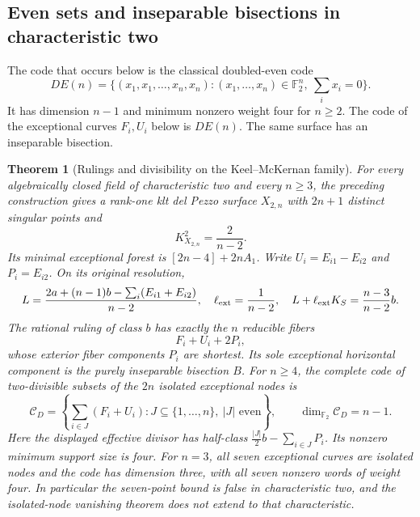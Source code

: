 \documentclass[11pt,reqno]{amsart}
\newtheorem{theorem}{Theorem}[section]
\theoremstyle{definition}
\theoremstyle{remark}
\newcommand{\FF}{\mathbb F}
\numberwithin{equation}{section}
\begin{document}
\subsection{Even sets and inseparable bisections in characteristic two}
The code that occurs below is the classical doubled-even code
\cite[Section~2]{DolgachevMendesLopesPardini}
\[
 DE(n)=\{(x_1,x_1,\ldots,x_n,x_n):
             (x_1,\ldots,x_n)\in\FF_2^n,\ \sum_i x_i=0\}.
\]
It has dimension $n-1$ and minimum nonzero weight four for $n\ge2$.
The code of the exceptional curves $F_i,U_i$ below is $DE(n)$.
The same surface has an inseparable bisection.

\begin{theorem}[Rulings and divisibility on the Keel--McKernan family]
\label{thm:characteristic-two}
For every algebraically closed field of characteristic two and every
$n\ge3$, the preceding construction gives a rank-one klt del Pezzo
surface $X_{2,n}$ with $2n+1$ distinct singular points and
\[
 K_{X_{2,n}}^2=\frac2{n-2}.
\]
Its minimal exceptional forest is $[2n-4]+2nA_1$.
Write $U_i=E_{i1}-E_{i2}$ and $P_i=E_{i2}$. On its original resolution,
\[
 L=\frac{2a+(n-1)b-\sum_i(E_{i1}+E_{i2})}{n-2},\quad
 \ell_{\rm ext}=\frac1{n-2},\quad
 L+\ell_{\rm ext}K_S=\frac{n-3}{n-2}b.
\]
The rational ruling of class $b$ has exactly the $n$ reducible
fibers
\[
 F_i+U_i+2P_i,
\]
whose exterior fiber components $P_i$ are shortest. Its sole exceptional
horizontal component is the purely inseparable bisection $B$.
For $n\ge4$, the complete code of two-divisible subsets of the $2n$
isolated exceptional nodes is
\[
 \mathcal C_D=
 \left\{\sum_{i\in J}(F_i+U_i):J\subseteq\{1,\ldots,n\},\ |J|
       \text{ even}\right\},
 \qquad \dim_{\FF_2}\mathcal C_D=n-1.
\]
Here the displayed effective divisor has half-class
$\frac{|J|}{2}b-\sum_{i\in J}P_i$. Its nonzero minimum support size is
four. For $n=3$, all seven exceptional curves are isolated nodes and the code
has dimension three, with all seven nonzero words of weight four.
In particular the seven-point bound is false in characteristic two,
and the isolated-node vanishing theorem does not extend to that
characteristic.
\end{theorem}
\end{document}
